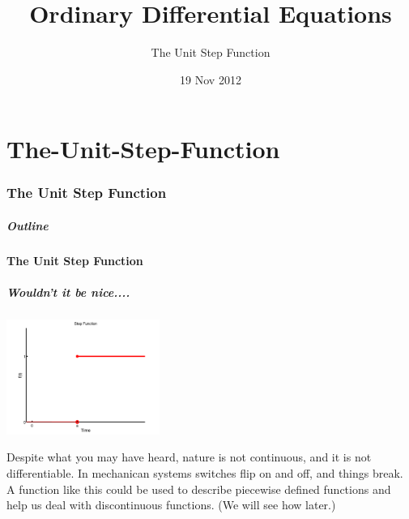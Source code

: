 \part{The-Unit-Step-Function}
\section{The Unit Step Function}

\title{Ordinary Differential Equations}
\subtitle{The Unit Step Function}
\date{19 Nov 2012}

\begin{frame}
  \titlepage
\end{frame}

\begin{frame}
  \frametitle{Outline}
\end{frame}


\subsection{The Unit Step Function}


\begin{frame}
  \frametitle{Wouldn't it be nice....}

  \centerline{\includegraphics[width=5cm]{img/unitStepAta}}

  {%

    Despite what you may have heard, nature is not continuous, and it
    is not differentiable.  In mechanican systems switches flip on and
    off, and things break. A function like this could be used to
    describe piecewise defined functions and help us deal with
    discontinuous functions. (We will see how later.)

  }

\end{frame}


